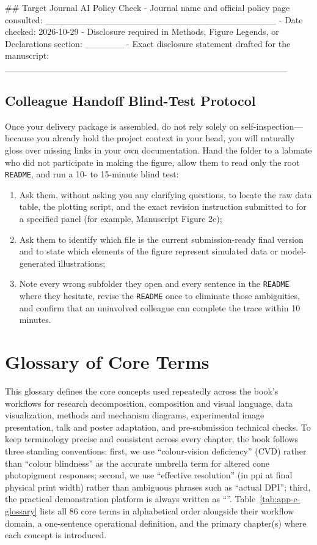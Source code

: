 \begin{Prompt}
## Target Journal AI Policy Check
- Journal name and official policy page consulted: ____________________________________
- Date checked: 2026-10-29
- Disclosure required in Methods, Figure Legends, or Declarations section: ______
- Exact disclosure statement drafted for the manuscript: ____________________________________________
\end{Prompt}

\section{Colleague Handoff Blind-Test Protocol}

Once your delivery package is assembled, do not rely solely on self-inspection---because you already hold the project context in your head, you will naturally gloss over missing links in your own documentation. Hand the folder to a labmate who did not participate in making the figure, allow them to read only the root \texttt{README}, and run a 10- to 15-minute blind test:

\begin{enumerate}
  \item Ask them, without asking you any clarifying questions, to locate the raw data table, the plotting script, and the exact revision instruction submitted to \scidraw{} for a specified panel (for example, Manuscript Figure 2c);
  \item Ask them to identify which file is the current submission-ready final version and to state which elements of the figure represent simulated data or model-generated illustrations;
  \item Note every wrong subfolder they open and every sentence in the \texttt{README} where they hesitate, revise the \texttt{README} once to eliminate those ambiguities, and confirm that an uninvolved colleague can complete the trace within 10 minutes.
\end{enumerate}

\chapter{Glossary of Core Terms}
\label{app:glossary}

This glossary defines the core concepts used repeatedly across the book's workflows for research decomposition, composition and visual language, data visualization, methods and mechanism diagrams, experimental image presentation, talk and poster adaptation, and pre-submission technical checks. To keep terminology precise and consistent across every chapter, the book follows three standing conventions: first, we use ``colour-vision deficiency'' (CVD) rather than ``colour blindness'' as the accurate umbrella term for altered cone photopigment responses; second, we use ``effective resolution'' (in ppi at final physical print width) rather than ambiguous phrases such as ``actual DPI''; third, the practical demonstration platform is always written as ``\scidraw{}''. Table~\ref{tab:app-e-glossary} lists all 86 core terms in alphabetical order alongside their workflow domain, a one-sentence operational definition, and the primary chapter(s) where each concept is introduced.

